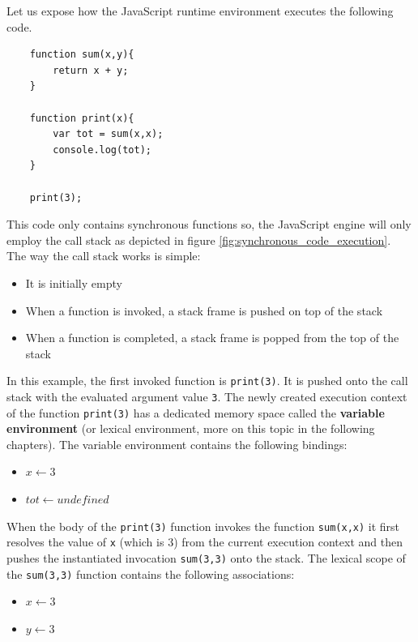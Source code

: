 \documentclass{scrbook}
\begin{document}
Let us expose how the JavaScript runtime environment executes the following code.

\begin{lstlisting}
    function sum(x,y){
        return x + y;
    }
    
    function print(x){
        var tot = sum(x,x);
        console.log(tot);
    }
    
    print(3);
\end{lstlisting}

This code only contains synchronous functions so, the JavaScript engine will only employ the call stack as depicted in figure \ref{fig:synchronous_code_execution}.\\

The way the call stack works is simple:
\begin{itemize}
    \item It is initially empty
    \item When a function is invoked, a stack frame is pushed on top of the stack
    \item When a function is completed, a stack frame is popped from the top of the stack
\end{itemize}

In this example, the first invoked function is \texttt{print(3)}. It is pushed onto the call stack with the evaluated argument value \texttt{3}. The newly created execution context of the function \texttt{print(3)} has a dedicated memory space called the \textbf{variable environment} (or lexical environment, more on this topic in the following chapters). The variable environment contains the following bindings:
\begin{itemize}
    \item $x \leftarrow 3$
    \item $tot \leftarrow undefined$
\end{itemize}

When the body of the \texttt{print(3)} function invokes the function \texttt{sum(x,x)} it first resolves the value of \texttt{x} (which is $3$) from the current execution context and then pushes the instantiated invocation \texttt{sum(3,3)} onto the stack. The lexical scope of the \texttt{sum(3,3)} function contains the following associations:
\begin{itemize}
    \item $x \leftarrow 3$
    \item $y \leftarrow 3$
\end{itemize}
\end{document}

